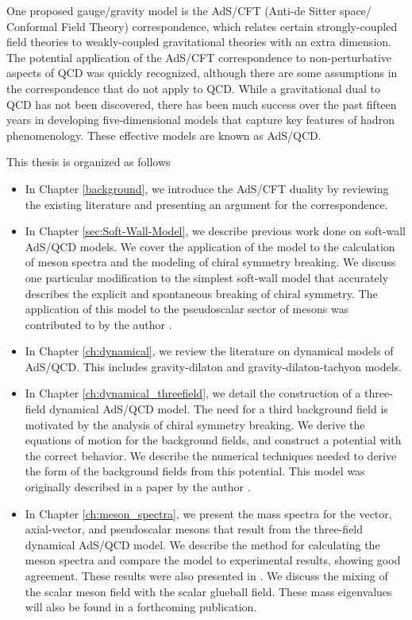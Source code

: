 One proposed gauge/gravity model is the AdS/CFT (Anti-de Sitter space/ Conformal Field Theory) correspondence, which relates certain strongly-coupled field theories to weakly-coupled gravitational theories with an extra dimension.
The potential application of the AdS/CFT correspondence to non-perturbative aspects of QCD was quickly recognized, although there are some assumptions in the correspondence that do not apply to QCD.
While a gravitational dual to QCD has not been discovered, there has been much success over the past fifteen years in developing five-dimensional models that capture key features of hadron phenomenology.
These effective models are known as AdS/QCD.

This thesis is organized as follows
\begin{itemize}

\item In Chapter \ref{background}, we introduce the AdS/CFT duality by reviewing the existing literature and presenting an argument for the correspondence.

\item In Chapter \ref{sec:Soft-Wall-Model}, we describe previous work done on soft-wall AdS/QCD models. 
We cover the application of the model to the calculation of meson spectra and the modeling of chiral symmetry breaking.
We discuss one particular modification to the simplest soft-wall model that accurately describes the explicit and spontaneous breaking of chiral symmetry. 
The application of this model to the pseudoscalar sector of mesons was contributed to by the author \cite{bartz-pions}.

\item In Chapter \ref{ch:dynamical}, we review the literature on dynamical models of AdS/QCD. 
This includes gravity-dilaton and gravity-dilaton-tachyon models.

\item In Chapter \ref{ch:dynamical_threefield}, we detail the construction of a three-field dynamical AdS/QCD model.
The need for a third background field is motivated by the analysis of chiral symmetry breaking. 
We derive the equations of motion for the background fields, and construct a potential with the correct behavior.
We describe the numerical techniques needed to derive the form of the background fields from this potential.
This model was originally described in a paper by the author \cite{Bartz2014}.

\item In Chapter \ref{ch:meson_spectra}, we present the mass spectra for the vector, axial-vector, and pseudoscalar mesons that result from the three-field dynamical AdS/QCD model.
We describe the method for calculating the meson spectra and compare the model to experimental results, showing good agreement. 
These results were also presented in \cite{Bartz2014}.
We discuss the mixing of the scalar meson field with the scalar glueball field. 
These mass eigenvalues will also be found in a forthcoming publication.



\end{itemize}
